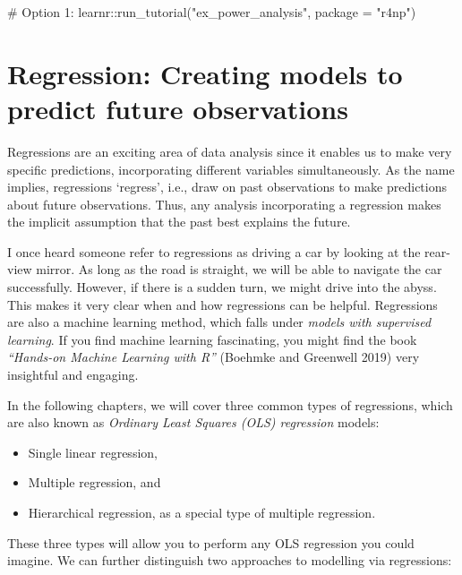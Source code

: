 \documentclass[
  letterpaper,
]{krantz}
\makeatletter
\newenvironment{Shaded}{\begin{snugshade}}{\end{snugshade}}
\newcommand{\AttributeTok}[1]{\textcolor[rgb]{0.40,0.45,0.13}{#1}}
\newcommand{\CommentTok}[1]{\textcolor[rgb]{0.37,0.37,0.37}{#1}}
\newcommand{\FunctionTok}[1]{\textcolor[rgb]{0.28,0.35,0.67}{#1}}
\newcommand{\NormalTok}[1]{\textcolor[rgb]{0.00,0.23,0.31}{#1}}
\newcommand{\SpecialCharTok}[1]{\textcolor[rgb]{0.37,0.37,0.37}{#1}}
\newcommand{\StringTok}[1]{\textcolor[rgb]{0.13,0.47,0.30}{#1}}
\newenvironment{kframe}{%
\medskip{}
\setlength{\fboxsep}{.8em}
 \def\at@end@of@kframe{}%
 \ifinner\ifhmode%
  \def\at@end@of@kframe{\end{minipage}}%
  \begin{minipage}{\columnwidth}%
 \fi\fi%
 \def\FrameCommand##1{\hskip\@totalleftmargin \hskip-\fboxsep
 \colorbox{shadecolor}{##1}\hskip-\fboxsep
     \hskip-\linewidth \hskip-\@totalleftmargin \hskip\columnwidth}%
 \MakeFramed {\advance\hsize-\width
   \@totalleftmargin\z@ \linewidth\hsize
   \@setminipage}}%
 {\par\unskip\endMakeFramed%
 \at@end@of@kframe}
\renewenvironment{Shaded}{\begin{kframe}}{\end{kframe}}
\makeatother
\begin{document}
\begin{Shaded}
\begin{Highlighting}[]
\CommentTok{\# Option 1:}
\NormalTok{learnr}\SpecialCharTok{::}\FunctionTok{run\_tutorial}\NormalTok{(}\StringTok{"ex\_power\_analysis"}\NormalTok{, }\AttributeTok{package =} \StringTok{"r4np"}\NormalTok{)}
\end{Highlighting}
\end{Shaded}


\chapter{Regression: Creating models to predict future
observations}\label{sec-regression}

Regressions are an exciting area of data analysis since it enables us to
make very specific predictions, incorporating different variables
simultaneously. As the name implies, regressions `regress', i.e., draw
on past observations to make predictions about future observations.
Thus, any analysis incorporating a regression makes the implicit
assumption that the past best explains the future.

I once heard someone refer to regressions as driving a car by looking at
the rear-view mirror. As long as the road is straight, we will be able
to navigate the car successfully. However, if there is a sudden turn, we
might drive into the abyss. This makes it very clear when and how
regressions can be helpful. Regressions are also a machine learning
method, which falls under \emph{models with supervised learning}. If you
find machine learning fascinating, you might find the book
\emph{``Hands-on Machine Learning with R''} (Boehmke and Greenwell 2019)
very insightful and engaging.

In the following chapters, we will cover three common types of
regressions, which are also known as \emph{Ordinary Least Squares (OLS)
regression} models:

\begin{itemize}
\item
  Single linear regression,
\item
  Multiple regression, and
\item
  Hierarchical regression, as a special type of multiple regression.
\end{itemize}

These three types will allow you to perform any OLS regression you could
imagine. We can further distinguish two approaches to modelling via
regressions:
\end{document}
